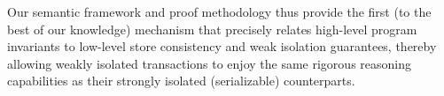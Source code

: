 Our semantic framework and proof methodology thus provide the first
(to the best of our knowledge) mechanism that precisely relates
high-level program invariants to low-level store consistency and weak
isolation guarantees, thereby allowing weakly isolated transactions to
enjoy the same rigorous reasoning capabilities as their strongly
isolated (serializable) counterparts.


